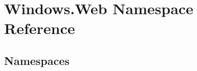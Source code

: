\hypertarget{namespace_windows_1_1_web}{}\section{Windows.\+Web Namespace Reference}
\label{namespace_windows_1_1_web}
\subsection*{Namespaces}
\begin{DoxyCompactItemize}
\end{DoxyCompactItemize}
